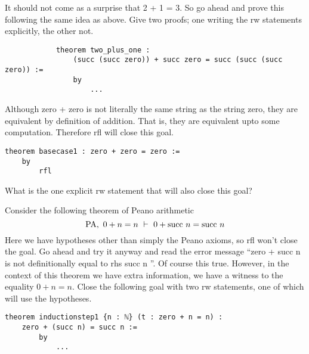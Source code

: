 \documentclass{book}
\begin{document}
\begin{eg}

    It should not come as a surprise that 2 + 1 = 3. So go ahead and prove this following the same idea as above. Give two proofs; one writing the rw statements explicitly, the other not. 

    \begin{center}
        \begin{lstlisting}
            theorem two_plus_one : 
                (succ (succ zero)) + succ zero = succ (succ (succ zero)) :=
                by
                    ...
        \end{lstlisting}
    \end{center}
\end{eg}

\begin{eg}

    Although zero + zero is not literally the same string as the string zero, they are equivalent by definition of addition. That is, they are equivalent upto some computation. Therefore rfl will close this goal.

    \begin{center}
        \begin{lstlisting}
theorem basecase1 : zero + zero = zero :=
    by
        rfl
        \end{lstlisting}
    \end{center}

    What is the one explicit rw statement that will also close this goal? 
\end{eg}

\newpage
\begin{eg}

    Consider the following theorem of Peano arithmetic $$\PA, \ 0 + n = n \ \vdash \ 0 + \suc \ n = \suc \ n$$Here we have hypotheses other than simply the Peano axioms, so rfl won't close the goal. Go ahead and try it anyway and read the error message ``zero + succ n is not definitionally equal to rhs succ n
    ''. Of course this true. However, in the context of this theorem we have extra information, we have a witness to the equality $0 + n = n$. Close the following goal with two rw statements, one of which will use the hypotheses. 

    \begin{center}
        \begin{lstlisting}
theorem inductionstep1 {n : ℕ} (t : zero + n = n) : 
    zero + (succ n) = succ n :=
        by
            ...
        \end{lstlisting}
    \end{center}
\end{eg}
\end{document}
